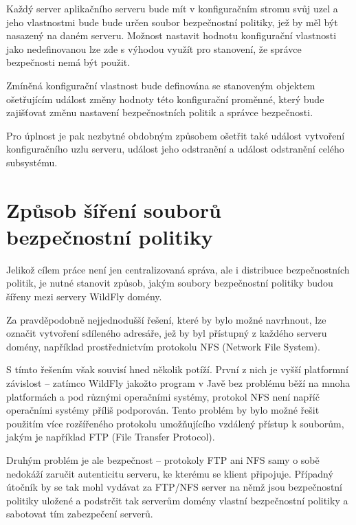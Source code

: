 Každý server aplikačního serveru bude mít v konfiguračním stromu svůj uzel a jeho vlastnostmi bude bude určen soubor bezpečnostní politiky, jež by měl být nasazený na daném serveru.
Možnost nastavit hodnotu konfigurační vlastnosti jako nedefinovanou lze zde s výhodou využít pro stanovení, že správce bezpečnosti nemá být použit.

Zmíněná konfigurační vlastnost bude definována se stanoveným objektem ošetřujícím událost změny hodnoty této konfigurační proměnné, který bude zajišťovat
změnu nastavení bezpečnostních politik a správce bezpečnosti.

Pro úplnost je pak nezbytné obdobným způsobem ošetřit také událost vytvoření konfiguračního uzlu serveru, událost jeho odstranění a událost odstranění
celého subsystému.

\section{Způsob šíření souborů bezpečnostní politiky} \label{sireniSouboru}

Jelikož cílem práce není jen centralizovaná správa, ale i distribuce bezpečnostních politik, je nutné stanovit způsob, jakým soubory bezpečnostní politiky budou šířeny mezi servery WildFly domény.

Za pravděpodobně nejjednodušší řešení, které by bylo možné navrhnout, lze označit vytvoření sdíleného adresáře, jež by byl přístupný z každého serveru domény, například prostřednictvím protokolu NFS (Network File System).

S tímto řešením však souvisí hned několik potíží.
První z nich je vyšší platformní závislost -- zatímco WildFly jakožto program v Javě bez problému běží na mnoha platformách a pod různými operačními systémy, protokol NFS není napříč operačními systémy příliš podporován.
Tento problém by bylo možné řešit použitím více rozšířeného protokolu umožňujícího vzdálený přístup k souborům, jakým je například FTP (File Transfer Protocol).

Druhým problém je ale bezpečnost -- protokoly FTP ani NFS samy o sobě nedokáží zaručit autenticitu serveru, ke kterému se klient připojuje.
Případný útočník by se tak mohl vydávat za FTP/NFS server na němž jsou bezpečnostní politiky uložené a podstrčit tak serverům domény vlastní bezpečnostní politiky a sabotovat tím zabezpečení serverů.

